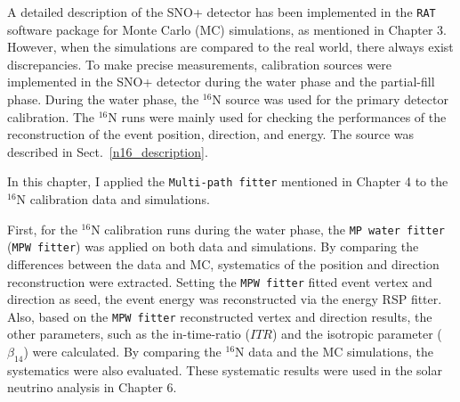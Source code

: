 A detailed description of the SNO+ detector has been implemented in the \texttt{RAT} software package for Monte Carlo (MC) simulations, as mentioned in Chapter 3. However, when the simulations are compared to the real world, there always exist discrepancies. To make precise measurements, calibration sources were implemented in the SNO+ detector during the water phase and the partial-fill phase. During the water phase, the $^{16}$N source was used for the primary detector calibration. The $^{16}$N runs were mainly used for checking the performances of the reconstruction of the event position, direction, and energy. The source was described in Sect.~\ref{n16_description}.

In this chapter, I applied the \texttt{Multi-path fitter} mentioned in Chapter 4 to the $^{16}$N calibration data and simulations.

First, for the $^{16}$N calibration runs during the water phase, the \texttt{MP water fitter} (\texttt{MPW fitter}) was applied on both data and simulations. By comparing the differences between the data and MC, systematics of the position and direction reconstruction were extracted. Setting the \texttt{MPW fitter} fitted event vertex and direction as seed, the event energy was reconstructed via the energy RSP fitter. Also, based on the \texttt{MPW fitter} reconstructed vertex and direction results, the other parameters, such as the in-time-ratio ($ITR$) and the isotropic parameter ($\beta_{14}$) were calculated. By comparing the $^{16}$N data and the MC simulations, the systematics were also evaluated. These systematic results were used in the solar neutrino analysis in Chapter 6.



